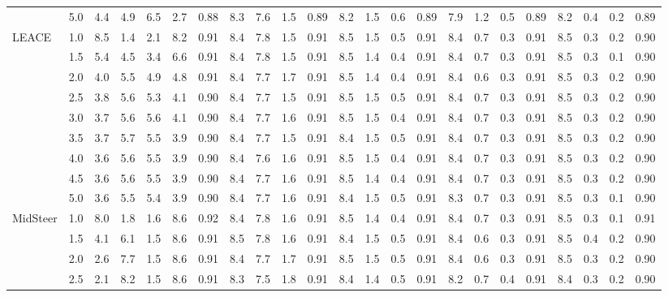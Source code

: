 \begin{table}
{\begin{tabular}{lc|cc|ccc|cccc|cccc|cccc|cccc}
 & 5.0 & 4.4 & 4.9 & 6.5 & 2.7 & 0.88 & 8.3 & 7.6 & 1.5 & 0.89 & 8.2 & 1.5 & 0.6 & 0.89 & 7.9 & 1.2 & 0.5 & 0.89 & 8.2 & 0.4 & 0.2 & 0.89 \\
\cline{1-23}
\multirow{9}{*}{LEACE} & 1.0 & 8.5 & 1.4 & 2.1 & 8.2 & 0.91 & 8.4 & 7.8 & 1.5 & 0.91 & 8.5 & 1.5 & 0.5 & 0.91 & 8.4 & 0.7 & 0.3 & 0.91 & 8.5 & 0.3 & 0.2 & 0.90 \\
 & 1.5 & 5.4 & 4.5 & 3.4 & 6.6 & 0.91 & 8.4 & 7.8 & 1.5 & 0.91 & 8.5 & 1.4 & 0.4 & 0.91 & 8.4 & 0.7 & 0.3 & 0.91 & 8.5 & 0.3 & 0.1 & 0.90 \\
 & 2.0 & 4.0 & 5.5 & 4.9 & 4.8 & 0.91 & 8.4 & 7.7 & 1.7 & 0.91 & 8.5 & 1.4 & 0.4 & 0.91 & 8.4 & 0.6 & 0.3 & 0.91 & 8.5 & 0.3 & 0.2 & 0.90 \\
 & 2.5 & 3.8 & 5.6 & 5.3 & 4.1 & 0.90 & 8.4 & 7.7 & 1.5 & 0.91 & 8.5 & 1.5 & 0.5 & 0.91 & 8.4 & 0.7 & 0.3 & 0.91 & 8.5 & 0.3 & 0.2 & 0.90 \\
 & 3.0 & 3.7 & 5.6 & 5.6 & 4.1 & 0.90 & 8.4 & 7.7 & 1.6 & 0.91 & 8.5 & 1.5 & 0.4 & 0.91 & 8.4 & 0.7 & 0.3 & 0.91 & 8.5 & 0.3 & 0.2 & 0.90 \\
 & 3.5 & 3.7 & 5.7 & 5.5 & 3.9 & 0.90 & 8.4 & 7.7 & 1.5 & 0.91 & 8.4 & 1.5 & 0.5 & 0.91 & 8.4 & 0.7 & 0.3 & 0.91 & 8.5 & 0.3 & 0.2 & 0.90 \\
 & 4.0 & 3.6 & 5.6 & 5.5 & 3.9 & 0.90 & 8.4 & 7.6 & 1.6 & 0.91 & 8.5 & 1.5 & 0.4 & 0.91 & 8.4 & 0.7 & 0.3 & 0.91 & 8.5 & 0.3 & 0.2 & 0.90 \\
 & 4.5 & 3.6 & 5.6 & 5.5 & 3.9 & 0.90 & 8.4 & 7.7 & 1.6 & 0.91 & 8.5 & 1.4 & 0.4 & 0.91 & 8.4 & 0.7 & 0.3 & 0.91 & 8.5 & 0.3 & 0.2 & 0.90 \\
 & 5.0 & 3.6 & 5.5 & 5.4 & 3.9 & 0.90 & 8.4 & 7.7 & 1.6 & 0.91 & 8.4 & 1.5 & 0.5 & 0.91 & 8.3 & 0.7 & 0.3 & 0.91 & 8.5 & 0.3 & 0.1 & 0.90 \\
\cline{1-23}
\multirow{9}{*}{MidSteer} & 1.0 & 8.0 & 1.8 & 1.6 & 8.6 & 0.92 & 8.4 & 7.8 & 1.6 & 0.91 & 8.5 & 1.4 & 0.4 & 0.91 & 8.4 & 0.7 & 0.3 & 0.91 & 8.5 & 0.3 & 0.1 & 0.91 \\
 & 1.5 & 4.1 & 6.1 & 1.5 & 8.6 & 0.91 & 8.5 & 7.8 & 1.6 & 0.91 & 8.4 & 1.5 & 0.5 & 0.91 & 8.4 & 0.6 & 0.3 & 0.91 & 8.5 & 0.4 & 0.2 & 0.90 \\
 & 2.0 & 2.6 & 7.7 & 1.5 & 8.6 & 0.91 & 8.4 & 7.7 & 1.7 & 0.91 & 8.5 & 1.5 & 0.5 & 0.91 & 8.4 & 0.6 & 0.3 & 0.91 & 8.5 & 0.3 & 0.2 & 0.90 \\
 & 2.5 & 2.1 & 8.2 & 1.5 & 8.6 & 0.91 & 8.3 & 7.5 & 1.8 & 0.91 & 8.4 & 1.4 & 0.5 & 0.91 & 8.2 & 0.7 & 0.4 & 0.91 & 8.4 & 0.3 & 0.2 & 0.90 \\

\end{tabular}}
\end{table}
